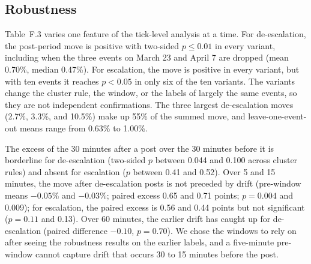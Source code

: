 \documentclass[11pt]{article}
\begin{document}
\subsection{Robustness}

Table~F.3 varies one feature of the tick-level analysis at a time. For de-escalation, the post-period move is positive with two-sided $p \leq 0.01$ in every variant, including when the three events on March 23 and April 7 are dropped (mean 0.70\%, median 0.47\%). For escalation, the move is positive in every variant, but with ten events it reaches $p < 0.05$ in only six of the ten variants. The variants change the cluster rule, the window, or the labels of largely the same events, so they are not independent confirmations. The three largest de-escalation moves (2.7\%, 3.3\%, and 10.5\%) make up 55\% of the summed move, and leave-one-event-out means range from 0.63\% to 1.00\%.

The excess of the 30 minutes after a post over the 30 minutes before it is borderline for de-escalation (two-sided $p$ between 0.044 and 0.100 across cluster rules) and absent for escalation ($p$ between 0.41 and 0.52). Over 5 and 15 minutes, the move after de-escalation posts is not preceded by drift (pre-window means $-0.05$\% and $-0.03$\%; paired excess 0.65 and 0.71 points; $p = 0.004$ and 0.009); for escalation, the paired excess is 0.56 and 0.44 points but not significant ($p = 0.11$ and 0.13). Over 60 minutes, the earlier drift has caught up for de-escalation (paired difference $-0.10$, $p = 0.70$). We chose the windows to rely on after seeing the robustness results on the earlier labels, and a five-minute pre-window cannot capture drift that occurs 30 to 15 minutes before the post.
\end{document}

